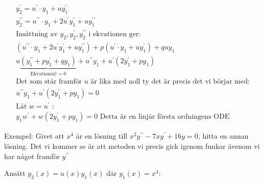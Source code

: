 \begin{equation*}
  \begin{gathered}
    y_{2}^{\prime}=u^{\prime}\cdot y_1+uy_{1}^{\prime}\\
    y_{2}^{\prime\prime}= u^{\prime\prime}\cdot y_1+2u^{\prime}y_{1}^{\prime}+uy_{1}^{\prime\prime}\\
    \text{Insättning av $y_2, y_2^{\prime}, y_2^{\prime\prime}$ i ekvationen ger: }\\
    (u^{\prime\prime}\cdot y_1+2u^{\prime}y_{1}^{\prime}+uy_{1}^{\prime\prime})+p(u^{\prime}\cdot y_1+uy_{1}^{\prime}) +quy_1\\
    u\underbrace{(y_{1}^{\prime\prime}+py_{1}^{\prime}+qy_1)}_{\text{Ekvationen! = 0}}+u^{\prime\prime}y_1+u^{\prime}(2y_{1}^{\prime}+py_1)\\
    \text{Det som står framför $u$ är lika med noll ty det är precis det vi börjar med:}\\
    u^{\prime\prime}y_1+u^{\prime}(2y_{1}^{\prime}+py_1)=0\\
    \text{Låt } w=u^{\prime} \text{ :}\\
    y_1w^{\prime}+w(2y_{1}^{\prime}+py_1)=0 \text{ Detta är en linjär första ordningens ODE}
  \end{gathered}
\end{equation*}
\par\bigskip

\noindent Exempel: Givet att $x^4$ är en lösning till $x^2y^{\prime\prime}-7xy^{\prime}+16y=0$, hitta en annan lösning. Det vi kommer se är att metoden vi precis gick igenom funkar ävenom vi har något framför $y^{\prime\prime}$
\par\bigskip
\noindent Ansätt $y_2(x)=u(x)y_1(x)$ där $y_1(x)=x^4$:

